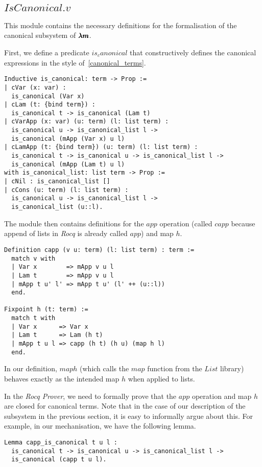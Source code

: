 \subsection{\lst$IsCanonical.v$}

This module contains the necessary definitions for the formalisation of the canonical subsystem of $\pmb{\lambda m}$.

First, we define a predicate \lst$is_canonical$ that constructively defines the canonical expressions in the style of~\cref{canonical_terms}.
\begin{lstlisting}[language=Coq]
Inductive is_canonical: term -> Prop :=
| cVar (x: var) :
  is_canonical (Var x)
| cLam (t: {bind term}) :
  is_canonical t -> is_canonical (Lam t)
| cVarApp (x: var) (u: term) (l: list term) :
  is_canonical u -> is_canonical_list l ->
  is_canonical (mApp (Var x) u l)
| cLamApp (t: {bind term}) (u: term) (l: list term) :
  is_canonical t -> is_canonical u -> is_canonical_list l ->
  is_canonical (mApp (Lam t) u l)
with is_canonical_list: list term -> Prop :=
| cNil : is_canonical_list []
| cCons (u: term) (l: list term) :
  is_canonical u -> is_canonical_list l ->
  is_canonical_list (u::l).
\end{lstlisting}

The module then contains definitions for the $app$ operation (called \lst$capp$ because append of lists in \textit{Rocq} is already called \lst$app$) and map $h$.
\begin{lstlisting}[language=Coq]
Definition capp (v u: term) (l: list term) : term :=
  match v with
  | Var x        => mApp v u l
  | Lam t        => mApp v u l
  | mApp t u' l' => mApp t u' (l' ++ (u::l))
  end.

Fixpoint h (t: term) :=
  match t with
  | Var x      => Var x
  | Lam t      => Lam (h t)
  | mApp t u l => capp (h t) (h u) (map h l)
  end.
\end{lstlisting}
In our definition, \lst$map h$ (which calls the \lst$map$ function from the \lst$List$ library) behaves exactly as the intended map $h$ when applied to lists.

In the \textit{Rocq Prover}, we need to formally prove that the $app$ operation and map $h$ are closed for canonical terms.
Note that in the case of our description of the subsystem in the previous section, it is easy to informally argue about this.
For example, in our mechanisation, we have the following lemma.
\begin{lstlisting}[language=Coq]
Lemma capp_is_canonical t u l :
  is_canonical t -> is_canonical u -> is_canonical_list l ->
  is_canonical (capp t u l).
\end{lstlisting}

